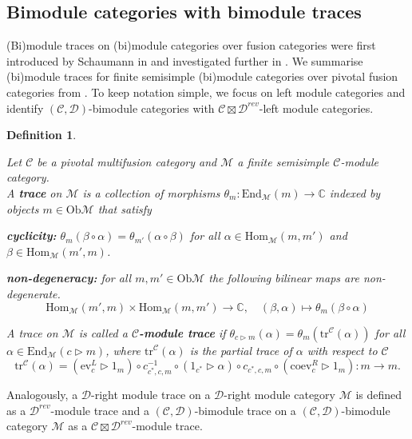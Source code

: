 \documentclass[1.5pt, a4paper]{article}
\newcommand{\C}{\mathbb{C}}
\newcommand{\mac}{\mathcal C}
\newcommand{\mad}{\mathcal D}
\newcommand{\mam}{\mathcal M}
\newcommand{\Hom}{\mathrm{Hom}}
\newcommand{\End}{\mathrm{End}}
\newcommand{\Ob}{\mathrm{Ob}}
\newcommand{\ev}{\mathrm{ev}}
\newcommand{\coev}{\mathrm{coev}}
\newcommand{\inv}[0]{{-1}}
\newcommand{\tr}[0]{\mathrm{tr}}
\newtheorem{definition}[theorem]{Definition}
\begin{document}
\subsection{Bimodule categories with bimodule traces}

(Bi)module traces on (bi)module categories over fusion categories were first  introduced by Schaumann in \cite{G12} and investigated further in  \cite{G14}.
We summarise (bi)module traces for finite semisimple (bi)module categories over pivotal fusion categories from \cite{G12,G14}. 
To keep notation simple, we focus on left module categories and identify $(\mac,\mad)$-bimodule categories with $\mac\boxtimes\mad^{rev}$-left module categories.


\begin{definition}\label{def:moduletrace} \cite[Def.~3.7]{G12}

Let $\mac$ be a pivotal multifusion category and $\mam$  a finite semisimple $\mac$-module category.\\
A {\bf trace} on $\mam$ is a collection of morphisms $\theta_m: \End_\mam(m)\to \C$ indexed by objects $m\in\Ob\mam$ that satisfy
\begin{compactenum}
\item {\bf cyclicity:} $\theta_m(\beta\circ \alpha)=\theta_{m'}(\alpha\circ \beta)$ for all $\alpha\in \Hom_\mam(m,m')$ and $\beta\in \Hom_\mam(m',m)$.
\item {\bf non-degeneracy:} for all $m,m'\in\Ob\mam$ the following bilinear maps are non-degenerate.
$$
\Hom_\mam(m',m)\times \Hom_\mam(m,m')\to \C,\quad (\beta,\alpha)\mapsto \theta_m(\beta\circ \alpha)
$$
\end{compactenum}
A trace  on $\mam$ is called a {\bf $\mac$-module trace} if $\theta_{c\rhd m}(\alpha)=\theta_{m}(\tr^\mac(\alpha))$ for all $\alpha\in \End_\mam(c\rhd m)$, where $\tr^\mac(\alpha)$  is the partial trace of $\alpha$ with respect to $\mac$
$$
\tr^\mac(\alpha)=(\ev^L_c\rhd 1_m)\circ c^\inv_{c^*,c,m}\circ (1_{c^*}\rhd \alpha)\circ c_{c^*,c,m}\circ (\coev^R_{c}\rhd 1_m): m\to m.
$$
\end{definition}

Analogously, a $\mad$-right module trace on a $\mad$-right module category $\mam$ is defined as a $\mad^{rev}$-module trace and a
$(\mac,\mad)$-bimodule trace on a $(\mac,\mad)$-bimodule category $\mam$ as a $\mac\boxtimes \mad^{rev}$-module trace. 
\end{document}
